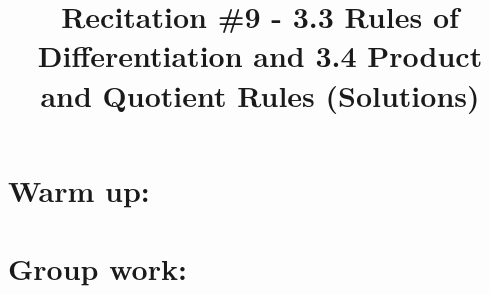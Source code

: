 \documentclass[nooutcomes]{ximera}
\title{Recitation \#9 - 3.3 Rules of Differentiation and 3.4 Product and Quotient Rules (Solutions)}
\begin{document}
\begin{abstract}		\end{abstract}
\maketitle

\section*{Warm up:} 
	
	\begin{freeResponse}
	\end{freeResponse}	
	
	
	
	
	

\section*{Group work:}

\begin{problem}

			\begin{freeResponse}
			
			\end{freeResponse}
\end{problem}
	
	
	
	
			
			

\begin{problem}

		\begin{freeResponse}

		\end{freeResponse}
		
\end{problem}









\begin{problem}

		\begin{freeResponse}
		
		\end{freeResponse}
		
\end{problem}







\begin{problem}

		\begin{freeResponse}
		\end{freeResponse}
		



\end{problem}
	
	
	
	
	
	
	
	
	

	










								
				
				
	
\end{document}
